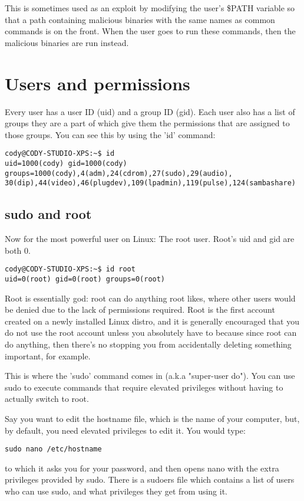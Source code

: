 \documentclass{article}
\begin{document}
This is sometimes used as an exploit by modifying the user's \$PATH variable so that a path containing malicious binaries with the same names as common commands is on the front. When the user goes to run these commands, then the malicious binaries are run instead.

\section{Users and permissions}
Every user has a user ID (uid) and a group ID (gid). Each user also has a list of groups they are a part of which give them the permissions that are assigned to those groups. You can see this by using the 'id' command:
\begin{verbatim}
cody@CODY-STUDIO-XPS:~$ id
uid=1000(cody) gid=1000(cody) groups=1000(cody),4(adm),24(cdrom),27(sudo),29(audio),
30(dip),44(video),46(plugdev),109(lpadmin),119(pulse),124(sambashare)
\end{verbatim}

\subsection{sudo and root}
Now for the most powerful user on Linux: The root user. Root's uid and gid are both 0.
\begin{verbatim}
cody@CODY-STUDIO-XPS:~$ id root
uid=0(root) gid=0(root) groups=0(root)
\end{verbatim}
Root is essentially god: root can do anything root likes, where other users would be denied due to the lack of permissions required. Root is the first account created on a newly installed Linux distro, and it is generally encouraged that you do not use the root account unless you absolutely have to because since root can do anything, then there's no stopping you from accidentally deleting something important, for example.

This is where the 'sudo' command comes in (a.k.a "super-user do"). You can use sudo to execute commands that require elevated privileges without having to actually switch to root.

Say you want to edit the hostname file, which is the name of your computer, but, by default, you need elevated privileges to edit it. You would type:
\begin{verbatim}
sudo nano /etc/hostname
\end{verbatim}
to which it asks you for your password, and then opens nano with the extra privileges provided by sudo. There is a sudoers file which contains a list of users who can use sudo, and what privileges they get from using it.
\end{document}

